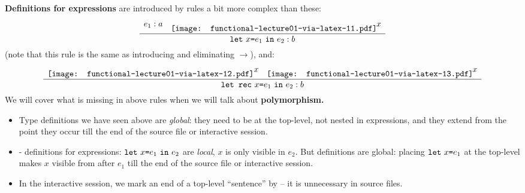 \documentclass{beamer}
\newcommand{\tmem}[1]{{\em #1\/}}
\newcommand{\tmstrong}[1]{\textbf{#1}}
\newcommand{\tmverbatim}[1]{\text{{\ttfamily{#1}}}}
\begin{document}
{{\begin{frame}
  {\tmstrong{Definitions for expressions}} are introduced by rules a bit more
  complex than these:
  \[ \frac{\begin{array}{ll}
       e_1 : a &
       \hspace{-0.00839564475928112cm}\raisebox{-0.772523329187369\height}{\texttt{[image: functional-lecture01-via-latex-11.pdf]}}\hspace{-0.02367834186016cm}
       \scriptsize{x}
     \end{array}}{\text{\tmverbatim{let} } x \text{\tmverbatim{=}} e_1 \text{
     \tmverbatim{in} } e_2 : b} \]
  (note that this rule is the same as introducing and eliminating
  $\rightarrow$), and:
  \[ \frac{\begin{array}{ll}
       \raisebox{-0.772143476814496\height}{\texttt{[image: functional-lecture01-via-latex-12.pdf]}}
       \scriptsize{x} &
       \hspace{-0.00839564475928112cm}\raisebox{-0.772523329187369\height}{\texttt{[image: functional-lecture01-via-latex-13.pdf]}}\hspace{-0.02367834186016cm}
       \scriptsize{x}
     \end{array}}{\text{\tmverbatim{let rec} } x \text{\tmverbatim{=}} e_1
     \text{ \tmverbatim{in} } e_2 : b} \]
  We will cover what is missing in above rules when we will talk about
  {\tmstrong{poly{\nobreak}morphism.}}
\end{frame}}{\begin{itemize}
  \item Type definitions we have seen above are {\tmem{global}}: they need to
  be at the top-level, not nested in expressions, and they extend from the
  point they occur till the end of the source file or interactive session.
  
  \item \tmverbatim{let}-\tmverbatim{in} definitions for expressions:
  $\text{\tmverbatim{let} } x \text{\tmverbatim{=}} e_1 \text{ \tmverbatim{in}
  } e_2$ are {\tmem{local}}, $x$ is only visible in $e_2$. But
  \tmverbatim{let} definitions are global: placing $\text{\tmverbatim{let} } x
  \text{\tmverbatim{=}} e_1$ at the top-level makes $x$ visible from after
  $e_1$ till the end of the source file or interactive session.
  
  \item In the interactive session, we mark an end of a top-level ``sentence''
  by \tmverbatim{;;} -- it is unnecessary in source files.
  

\end{itemize}}}
\end{document}
